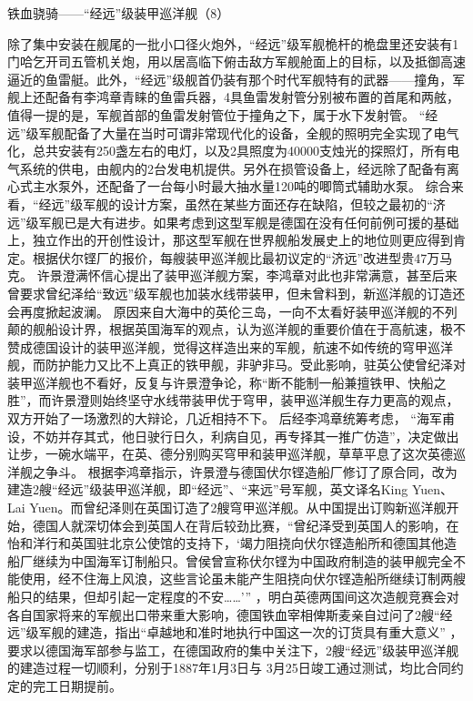 \documentclass[12pt,UTF8]{ctexbook}
\begin{document}
铁血骁骑——“经远”级装甲巡洋舰（8）

除了集中安装在舰尾的一批小口径火炮外，“经远”级军舰桅杆的桅盘里还安装有1门哈乞开司五管机关炮，用以居高临下俯击敌方军舰舱面上的目标，以及抵御高速逼近的鱼雷艇。此外，“经远”级舰首仍装有那个时代军舰特有的武器——撞角，军舰上还配备有李鸿章青睐的鱼雷兵器，4具鱼雷发射管分别被布置的首尾和两舷，值得一提的是，军舰首部的鱼雷发射管位于撞角之下，属于水下发射管。
“经远”级军舰配备了大量在当时可谓非常现代化的设备，全舰的照明完全实现了电气化，总共安装有250盏左右的电灯，以及2具照度为40000支烛光的探照灯，所有电气系统的供电，由舰内的2台发电机提供。另外在损管设备上，经远除了配备有离心式主水泵外，还配备了一台每小时最大抽水量120吨的唧筒式辅助水泵。
综合来看，“经远”级军舰的设计方案，虽然在某些方面还存在缺陷，但较之最初的“济远”级军舰已是大有进步。如果考虑到这型军舰是德国在没有任何前例可援的基础上，独立作出的开创性设计，那这型军舰在世界舰船发展史上的地位则更应得到肯定。根据伏尔铿厂的报价，每艘装甲巡洋舰比最初议定的“济远”改进型贵47万马克。 许景澄满怀信心提出了装甲巡洋舰方案，李鸿章对此也非常满意，甚至后来曾要求曾纪泽给“致远”级军舰也加装水线带装甲，但未曾料到，新巡洋舰的订造还会再度掀起波澜。
原因来自大海中的英伦三岛，一向不太看好装甲巡洋舰的不列颠的舰船设计界，根据英国海军的观点，认为巡洋舰的重要价值在于高航速，极不赞成德国设计的装甲巡洋舰，觉得这样造出来的军舰，航速不如传统的穹甲巡洋舰，而防护能力又比不上真正的铁甲舰，非驴非马。受此影响，驻英公使曾纪泽对装甲巡洋舰也不看好，反复与许景澄争论，称“断不能制一船兼擅铁甲、快船之胜”，而许景澄则始终坚守水线带装甲优于穹甲，装甲巡洋舰生存力更高的观点，双方开始了一场激烈的大辩论，几近相持不下。 后经李鸿章统筹考虑， “海军甫设，不妨并存其式，他日驶行日久，利病自见，再专择其一推广仿造”，决定做出让步，一碗水端平，在英、德分别购买穹甲和装甲巡洋舰，草草平息了这次英德巡洋舰之争斗。
根据李鸿章指示，许景澄与德国伏尔铿造船厂修订了原合同，改为建造2艘“经远”级装甲巡洋舰，即“经远”、“来远”号军舰，英文译名King Yuen、Lai Yuen。而曾纪泽则在英国订造了2艘穹甲巡洋舰。从中国提出订购新巡洋舰开始，德国人就深切体会到英国人在背后较劲比赛，“曾纪泽受到英国人的影响，在怡和洋行和英国驻北京公使馆的支持下，‘竭力阻挠向伏尔铿造船所和德国其他造船厂继续为中国海军订制船只。曾侯曾宣称伏尔铿为中国政府制造的装甲舰完全不能使用，经不住海上风浪，这些言论虽未能产生阻挠向伏尔铿造船所继续订制两艘船只的结果，但却引起一定程度的不安……’” ，明白英德两国间这次造舰竞赛会对各自国家将来的军舰出口带来重大影响，德国铁血宰相俾斯麦亲自过问了2艘“经远”级军舰的建造，指出“卓越地和准时地执行中国这一次的订货具有重大意义” ，要求以德国海军部参与监工，在德国政府的集中关注下，2艘“经远”级装甲巡洋舰的建造过程一切顺利，分别于1887年1月3日与 3月25日竣工通过测试，均比合同约定的完工日期提前。
\end{document}
